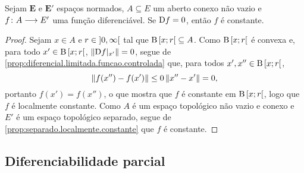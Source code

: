 \begin{proposition}
\label{prop:diferencial.zero.constante}
Sejam $\bm E$ e $\bm E'$ espaços normados, $A \subseteq E$ um aberto conexo não vazio e ${f}\colon {A} \longrightarrow {E'}$ uma função diferenciável. Se $\mathrm{D} f = 0$, então $f$ é constante.
\end{proposition}
\begin{proof}
Sejam $x \in A$ e $r \in \left]{0},{\infty}\right[$ tal que $\mathrm{B}\left[{x};{r}\right[\subseteq A$. Como $\mathrm{B}\left[{x};{r}\right[$ é convexa e, para todo $x' \in \mathrm{B}\left[{x};{r}\right[$, $\left\Vert{\mathrm{D}f|_{x'}}\right\Vert = 0$, segue de \ref{prop:diferencial.limitada.funcao.controlada} que, para todos $x',x'' \in \mathrm{B}\left[{x};{r}\right[$,
	\begin{equation*}
	\left\Vert{f(x'') - f(x')}\right\Vert \leq 0 \left\Vert{x''-x'}\right\Vert = 0,
	\end{equation*}
portanto $f(x') = f(x'')$, o que mostra que $f$ é constante em $\mathrm{B}\left[{x};{r}\right[$, logo que $f$ é localmente constante. Como $A$ é um espaço topológico não vazio e conexo e $E'$ é um espaço topológico separado, segue de \ref{prop:separado.localmente.constante} que $f$ é constante.
\end{proof}
\begin{comment}
\begin{proof}
Sejam $x,x' \in A$. Como $A$ é conexo, então $x$ e $x'$ são conectados por alguma trajetória poligonal $\fun{\gamma}{\intff{0}{1}}{A}$. Assim, $\gamma(0)=x$, $\gamma(1)=x'$ e alguma $n$-partição por intervalos $(t_k)_{k \in [n+1]} \in \R^{n+1}$ satisfaz, para todo $k \in [n]$, que $\gamma|_{\intff{t_k}{t_{k+1}}}$ é afim e $\gamma(\intff{t_k}{t_{k+1}}) = \Sxger{\gamma(t_k),\gamma(t_{k+1})}$.

Para todo $k \in [n]$, como $\D f = 0$, segue de \ref{prop:desigualdade.valor.medio} que
	\begin{equation*}
	\nor{f(\gamma(t_{k+1})) - f(\gamma(t_k))} \leq \sup_{y \in \Sxger{x,x'}} \nor{\D f|_y} \nor{x'-x} = 0.
	\end{equation*}
Por indução em $n$, obtemos que $f(\gamma(t_0)) = f(\gamma(t_n))$; ou seja,
	\begin{equation*}
	f(x) = f(\gamma(0)) = f(\gamma(t_0)) = f(\gamma(t_n)) = f(\gamma(1)) = f(x'),
	\end{equation*}
o que mostra que $f$ é constante.
\end{proof}
\end{comment}



\subsection{Diferenciabilidade parcial}

